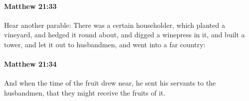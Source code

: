 		\paragraph{Matthew 21:33} %
			\label{MATTHEW-21-33}

			Hear another parable: There was a certain householder, which planted a vineyard, and hedged it round about, and digged a winepress in it, and built a tower, and let it out to husbandmen, and went into a far country:

			\begin{framed}
			\scriptsize
				\begin{compactdesc}
					\item[SBLG] 
				\end{compactdesc}
			\end{framed}

		\paragraph{Matthew 21:34} %
			\label{MATTHEW-21-34}

			And when the time of the fruit drew near, he sent his servants to the husbandmen, that they might receive the fruits of it.

